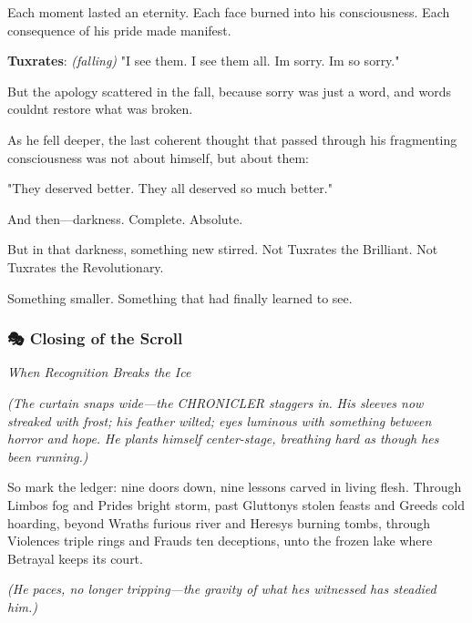 Each moment lasted an eternity. Each face burned into his consciousness. Each consequence of his pride made manifest.

\textbf{Tuxrates}: \emph{(falling)} "I see them. I see them all. I\textquotesingle m sorry. I\textquotesingle m so sorry."

But the apology scattered in the fall, because sorry was just a word, and words couldn\textquotesingle t restore what was broken.

As he fell deeper, the last coherent thought that passed through his fragmenting consciousness was not about himself, but about them:

"They deserved better. They all deserved so much better."

And then---darkness. Complete. Absolute.

But in that darkness, something new stirred. Not Tuxrates the Brilliant. Not Tuxrates the Revolutionary.

Something smaller. Something that had finally learned to see.

\bookdivider

\subsubsection{\texorpdfstring{\textbf{🎭 Closing of the Scroll}}{🎭 Closing of the Scroll}}\label{performing_arts-closing-of-the-scroll}

\emph{When Recognition Breaks the Ice}

\emph{(The curtain snaps wide---the CHRONICLER staggers in.} \emph{His sleeves now streaked with frost; his feather wilted; eyes luminous with something between horror and hope.} \emph{He plants himself center-stage, breathing hard as though he\textquotesingle s been running.)}


So mark the ledger: nine doors down, nine lessons carved in living flesh. Through Limbo\textquotesingle s fog and Pride\textquotesingle s bright storm, past Gluttony\textquotesingle s stolen feasts and Greed\textquotesingle s cold hoarding, beyond Wrath\textquotesingle s furious river and Heresy\textquotesingle s burning tombs, through Violence\textquotesingle s triple rings and Fraud\textquotesingle s ten deceptions, unto the frozen lake where Betrayal keeps its court.

\emph{(He paces, no longer tripping---the gravity of what he\textquotesingle s witnessed has steadied him.)}

